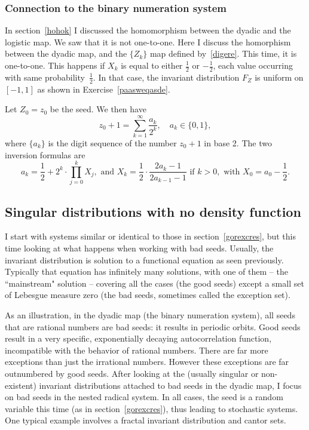 \documentclass[oneside,10pt]{book}
\begin{document}
\subsubsection{Connection to the binary numeration system}\label{pornicsew}

In section~\ref{hohok} I discussed the \textcolor{index}{homomorphism} between the dyadic and the logistic map.
 We saw that it is not one-to-one. Here I discuss the homorphism between the dyadic map, and the $\{Z_k\}$ map
 defined by~\ref{digere}. This time, it is one-to-one. This happens if $X_k$ is equal to either $\frac{1}{2}$ or $-\frac{1}{2}$, each value occurring with same probability~$\frac{1}{2}$. In that case, the invariant distribution $F_Z$ is uniform on $[-1, 1]$ as
 shown in Exercise~\ref{paasweqasde}.

\noindent Let $Z_0 = z_0$ be the seed. We then have
$$
z_0 + 1 = \sum_{k=1}^\infty \frac{a_k}{2^k}, \quad  a_k\in\{0, 1\},
$$
where $\{a_k\}$ is the digit sequence of the number $z_0+ 1$ in base 2. The two inversion formulas are
$$
a_k  = \frac{1}{2}+ 2^k \cdot \prod_{j=0}^k X_j, \text{ and }
X_k  = \frac{1}{2}\cdot \frac{2a_k -1}{2a_{k-1} -1} \text{ if } k>0, \text{ with } X_0 = a_0 -\frac{1}{2}.
$$

\subsection{Singular distributions with no density function}\label{nodensity}

I start with systems similar or identical to those in section~\ref{gorexcres}, but this time looking at what happens when working
  with \textcolor{index}{bad seeds}. Usually, the invariant distribution is solution
 to a \textcolor{index}{functional equation} as seen previously. Typically that equation has
 infinitely many solutions, with one of them -- the ``mainstream" solution -- covering all the cases (the good seeds) except a small
 set of Lebesgue measure zero (the bad seeds, sometimes called the \textcolor{index}{exception set}).

As an illustration, in the dyadic map (the binary numeration system), all seeds that are rational numbers are bad seeds: it results
 in periodic orbits. Good seeds result in a very specific, exponentially decaying autocorrelation function, incompatible with the behavior of rational numbers. There are far more exceptions than just the irrational numbers. However these exceptions are far outnumbered by good seeds. After looking at the (usually singular or non-existent) invariant distributions attached to bad seeds in the dyadic map, I focus on bad seeds in
 the nested radical system. In all cases, the seed is a random variable this time (as in section~\ref{gorexcres}), thus leading to stochastic systems. One typical example involves a fractal invariant distribution and cantor sets.
\end{document}
